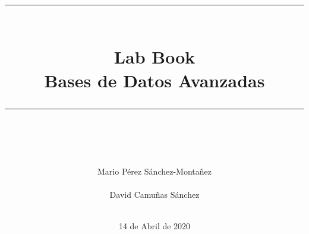 \documentclass[idxtotoc,hyperref,openany]{labbook} %
\newcommand{\HRule}{\rule{\linewidth}{0.5mm}} %
\begin{document}

\frontmatter %
\title{
\begin{center}
	\centering
\HRule \\[0.4cm]
{\Huge \bfseries Lab Book \\[0.5cm] \Large Bases de Datos Avanzadas}\\[0.4cm] %
\HRule \\[1.5cm]
\end{center}
}
\author{\Huge Mario Pérez Sánchez-Montañez \\ \\ \Huge David Camuñas Sánchez \\ \\[2cm]} %
\date{14 de Abril de 2020}
\maketitle

\tableofcontents

\mainmatter %








\end{document}
